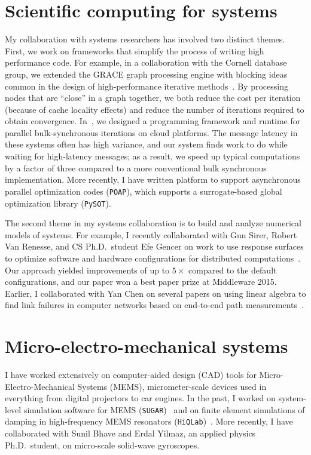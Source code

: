 \documentclass{amsart}
\begin{document}
\section{Scientific computing for systems}
\label{sec-sc-systems}

My collaboration with systems researchers has involved two distinct
themes. First, we work on frameworks that simplify the process of
writing high performance code.  For example, in a collaboration with the
Cornell database group, we extended the GRACE graph processing engine
with blocking ideas common in the design of high-performance iterative
methods~\cite{2013-blockgrace}.  By processing nodes that are ``close''
in a graph together, we both reduce the cost per iteration (because of
cache locality effects) and reduce the number of iterations required to
obtain convergence.  In~\cite{2011-socc}, we designed a programming
framework and runtime for parallel bulk-synchronous iterations on cloud
platforms.  The message latency in these systems often has high
variance, and our system finds work to do while waiting for high-latency
messages; as a result, we speed up typical computations by a factor of
three compared to a more conventional bulk synchronous implementation.
More recently, I have written platform to support asynchronous parallel
optimization codes ({\tt POAP}), which supports a surrogate-based global
optimization library ({\tt PySOT}).

The second theme in my systems collaboration is to build and analyze
numerical models of systems.  For example, I recently collaborated with Gun Sirer, Robert Van Renesse, and CS Ph.D.~student Efe Gencer on
work to use response surfaces to optimize software and hardware
configurations for distributed computations~\cite{2015-middleware}.  Our
approach yielded improvements of up to $5 \times$ compared to the
default configurations, and our paper won a best paper prize at
Middleware 2015.  Earlier, I collaborated with Yan Chen on several papers
on using linear algebra to find link failures in computer networks based
on end-to-end path
measurements~\cite{2009-tons,2007-tons,2006-sigcomm,2006-sigmetrics,2004-sigcomm,2003-imc}.

\section{Micro-electro-mechanical systems}
\label{sec-engineering}

I have worked extensively on computer-aided design (CAD) tools for
Micro-Electro-Mechanical Systems (MEMS), micrometer-scale devices used
in everything from digital projectors to car engines.  In the past, I
worked on system-level simulation software for MEMS
({\tt SUGAR})~\cite{2002-mems,2001-sugar,2001-msm,2000-mems}
and on finite element simulations of damping in high-frequency
MEMS resonators
({\tt HiQLab})~\cite{2012-mems-opt,2005-sensors,2005-ijnme,2005-mems,2004-para}.
More recently, I have collaborated with Sunil Bhave and
Erdal Yilmaz, an applied physics Ph.D.~student, on micro-scale
solid-wave gyroscopes.
\end{document}
